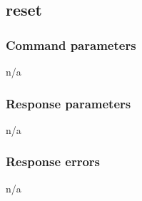 \subsection{reset}

\subsubsection{Command parameters}

n/a

\subsubsection{Response parameters}

n/a

\subsubsection{Response errors}

n/a
